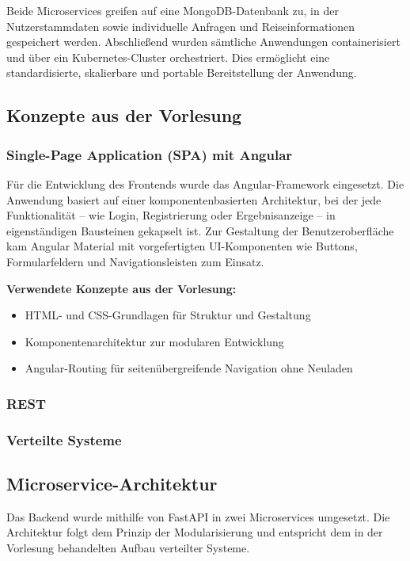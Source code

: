 Beide Microservices greifen auf eine MongoDB-Datenbank zu, in der Nutzerstammdaten sowie individuelle Anfragen und Reiseinformationen gespeichert werden.  
Abschließend wurden sämtliche Anwendungen containerisiert und über ein Kubernetes-Cluster orchestriert. Dies ermöglicht eine standardisierte, skalierbare und portable Bereitstellung der Anwendung.

\subsection{Konzepte aus der Vorlesung}

\subsubsection{Single-Page Application (SPA) mit Angular}

Für die Entwicklung des Frontends wurde das Angular-Framework eingesetzt. Die Anwendung basiert auf einer komponentenbasierten Architektur, bei der jede Funktionalität – wie Login, Registrierung oder Ergebnisanzeige – in eigenständigen Bausteinen gekapselt ist. Zur Gestaltung der Benutzeroberfläche kam Angular Material mit vorgefertigten UI-Komponenten wie Buttons, Formularfeldern und Navigationsleisten zum Einsatz.

\textbf{Verwendete Konzepte aus der Vorlesung:}
\begin{itemize}
  \item HTML- und CSS-Grundlagen für Struktur und Gestaltung
  \item Komponentenarchitektur zur modularen Entwicklung
  \item Angular-Routing für seitenübergreifende Navigation ohne Neuladen
\end{itemize}

\subsubsection{REST}

\subsubsection{Verteilte Systeme}

\subsection{Microservice-Architektur}

Das Backend wurde mithilfe von FastAPI in zwei Microservices umgesetzt. Die Architektur folgt dem Prinzip der Modularisierung und entspricht dem in der Vorlesung behandelten Aufbau verteilter Systeme.

